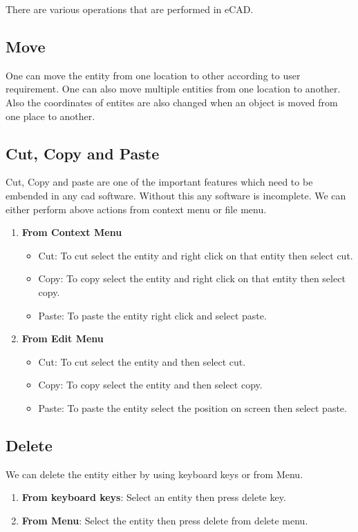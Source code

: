 There are various operations that are performed in eCAD.
\subsection{Move}
One can move the entity from one location to other according to user requirement. One can also move multiple entities from one location to another. Also the coordinates of entites are also changed when an object is moved from one place to another. 
\subsection{Cut, Copy and Paste}
Cut, Copy and paste are one of the important features which need to be embended in any cad software. Without this any software is incomplete. We can either perform above actions from context menu or file menu.
\begin{enumerate}
\item \textbf{From Context Menu}
\begin{itemize}
\item Cut: To cut select the entity and right click on that entity then select cut. 
\item Copy: To copy select the entity and right click on that entity then select copy.
\item Paste: To paste the entity right click and select paste.
\end{itemize}
\item \textbf{From Edit Menu}
\begin{itemize}
\item Cut: To cut select the entity and  then select cut. 
\item Copy: To copy select the entity and  then select copy.
\item Paste: To paste the entity select the position on screen then select paste.
\end{itemize}
\end{enumerate}
\subsection{Delete}
We can delete the entity either by using keyboard keys or from Menu.
\begin{enumerate}
\item \textbf{From keyboard keys}:
Select an entity then press delete key.
\item \textbf{From Menu}:
Select the entity then press delete from delete menu.
\end{enumerate}
